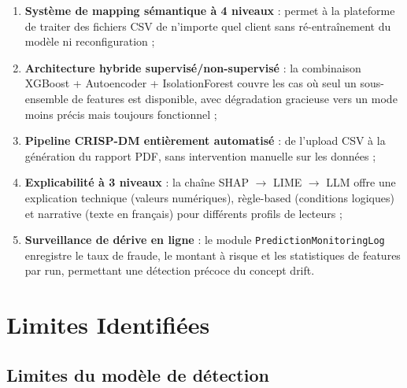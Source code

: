 \documentclass[12pt,a4paper,twoside]{report}
\theoremstyle{definition}
\begin{document}
\begin{enumerate}
  \item \textbf{Système de mapping sémantique à 4 niveaux} : permet à la
    plateforme de traiter des fichiers CSV de n'importe quel client sans
    ré-entraînement du modèle ni reconfiguration ;

  \item \textbf{Architecture hybride supervisé/non-supervisé} : la combinaison
    XGBoost + Autoencoder + IsolationForest couvre les cas où seul un
    sous-ensemble de features est disponible, avec dégradation gracieuse
    vers un mode moins précis mais toujours fonctionnel ;

  \item \textbf{Pipeline CRISP-DM entièrement automatisé} : de l'upload CSV
    à la génération du rapport PDF, sans intervention manuelle sur les données ;

  \item \textbf{Explicabilité à 3 niveaux} : la chaîne SHAP $\rightarrow$
    LIME $\rightarrow$ LLM offre une explication technique (valeurs numériques),
    règle-based (conditions logiques) et narrative (texte en français)
    pour différents profils de lecteurs ;

  \item \textbf{Surveillance de dérive en ligne} : le module
    \texttt{PredictionMonitoringLog} enregistre le taux de fraude, le montant
    à risque et les statistiques de features par run, permettant une
    détection précoce du concept drift.
\end{enumerate}

\section{Limites Identifiées}

\subsection{Limites du modèle de détection}
\end{document}
